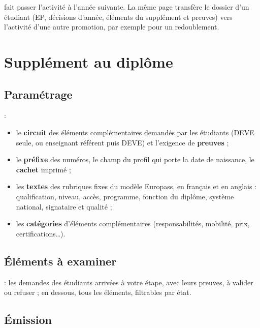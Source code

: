 \documentclass[11pt,a4paper]{article}
\begin{document}
 fait passer l'activité à l'année suivante. La même page
transfère le dossier d'un étudiant (EP, décisions d'année, éléments du supplément et preuves)
vers l'activité d'une autre promotion, par exemple pour un redoublement.

\section{Supplément au diplôme}\label{sec:supplement}

\subsection{Paramétrage}

 :
\begin{itemize}
  \item le \textbf{circuit} des éléments complémentaires demandés par les étudiants (DEVE seule,
    ou enseignant référent puis DEVE) et l'exigence de \textbf{preuves} ;
  \item le \textbf{préfixe} des numéros, le champ du profil qui porte la date de naissance, le
    \textbf{cachet} imprimé ;
  \item les \textbf{textes} des rubriques fixes du modèle Europass, en français et en anglais :
    qualification, niveau, accès, programme, fonction du diplôme, système national, signataire
    et qualité ;
  \item les \textbf{catégories} d'éléments complémentaires (responsabilités, mobilité, prix,
    certifications\dots).
\end{itemize}


\subsection{Éléments à examiner}

 : les demandes des étudiants arrivées à votre étape,
avec leurs preuves, à valider ou refuser ; en dessous, tous les éléments, filtrables par état.

\subsection{Émission}
\end{document}
